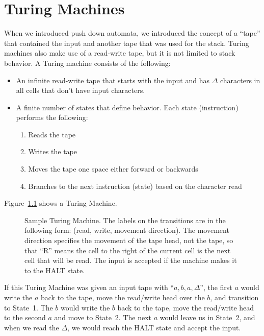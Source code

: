\documentclass[letterpaper,12pt,openany,reqno]{book}%
\newcommand{\fanonterminalnode}[2] {\node at (#1) (#2) [circle, draw, minimum size=24pt] {#2};}
\newcommand{\fabelowtransition}[3] {\draw [->] (#1) -- (#2) node [midway, below] {#3};}
\newcommand{\faarctransition}[5] {\draw [->] (#1) to[out=#4, in=#5] node  [midway, above] {#3} (#2) ;}
\newcommand{\faarcbelowtransition}[5] {\draw [->] (#1) to[out=#4, in=#5] node  [midway, below] {#3} (#2) ;}
\newcommand{\falooptop}[2] {\path (#1) edge [loop above] node {#2} ();}
\newcommand{\faloopbottom}[2] {\path (#1) edge [loop below] node {#2} ();}
\newcommand{\pdaterminal}[3] {\node at (#1) (#2) [rectangle, draw, rounded corners] {#3};}
\begin{document}
\chapter{Turing Machines}
When we introduced push down automata, we introduced the concept of a ``tape'' that contained the input and another tape that was used for the stack. Turing machines also make use of a read-write tape, but it is not limited to stack behavior. A Turing machine consists of the following:
\begin{itemize}
\item An infinite read-write tape that starts with the input and has $\Delta$ characters in all cells that don't have input characters.
\item A finite number of states that define behavior. Each state (instruction) performs the following:
\begin{enumerate}
\item Reads the tape
\item Writes the tape
\item Moves the tape one space either forward or backwards
\item Branches to the next instruction (state) based on the character read
\end{enumerate}
\end{itemize}
Figure~\ref{F.TM.1} shows a Turing Machine.
\begin{figure}[htbp]
\centering
{}
\caption[Sample Turing Machine]{Sample Turing Machine. The labels on the transitions are in the following form: (read, write, movement direction). The movement direction specifies the movement of the tape head, not the tape, so that ``R'' means the cell to the right of the current cell is the next cell that will be read. The input is accepted if the machine makes it to the HALT state.}
\label{F.TM.1}
\end{figure}
If this Turing Machine was given an input tape with ``$a,b,a,\Delta$'', the first $a$ would write the $a$ back to the tape, move the read/write head over the $b$, and transition to State~1. The $b$ would write the $b$ back to the tape, move the read/write head to the second $a$ and move to State~2. The next $a$ would leave us in State~2, and when we read the $\Delta$, we would reach the HALT state and accept the input.
\end{document}
